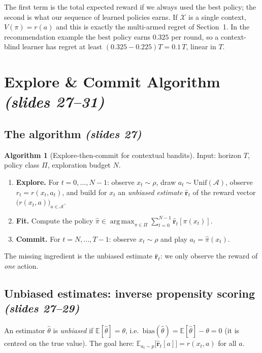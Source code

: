 \documentclass[11pt,a4paper]{article}
\newcommand{\E}{\mathbb{E}}
\newcommand{\Unif}{\mathrm{Unif}}
\newcommand{\rh}{\hat{\mathbf{r}}}
\newcommand{\calA}{\mathcal{A}}
\newcommand{\calX}{\mathcal{X}}
\DeclareMathOperator*{\argmax}{arg\,max}
\newcommand{\slides}[1]{\emph{(slides #1)}}
\theoremstyle{plain}
\theoremstyle{definition}
\newtheorem{algorithm}[theorem]{Algorithm}
\theoremstyle{remark}
\begin{document}
\begin{intuition}
The first term is the total expected reward if we always used the best policy; the second is what our sequence of learned policies earns.
If $\calX$ is a single context, $V(\pi)=r(a)$ and this is exactly the multi-armed regret of Section~1. In the recommendation example the
best policy earns $0.325$ per round, so a context-blind learner has regret at least $(0.325-0.225)T=0.1\,T$, linear in $T$.
\end{intuition}

\section{Explore \& Commit Algorithm \slides{27--31}}

\subsection{The algorithm \slides{27}}

\begin{algorithm}[Explore-then-commit for contextual bandits]\label{alg:ec}
Input: horizon $T$, policy class $\Pi$, exploration budget $N$.
\begin{enumerate}
 \item \textbf{Explore.} For $t=0,\dots,N-1$: observe $x_t\sim\rho$, draw $a_t\sim\Unif(\calA)$, observe $r_t=r(x_t,a_t)$, and build for $x_t$ an
       \emph{unbiased estimate} $\rh_t$ of the reward vector $\bigl(r(x_t,a)\bigr)_{a\in\calA}$.
 \item \textbf{Fit.} Compute the policy $\displaystyle\hat\pi\in\argmax_{\pi\in\Pi}\sum_{t=0}^{N-1}\rh_t[\pi(x_t)]$.
 \item \textbf{Commit.} For $t=N,\dots,T-1$: observe $x_t\sim\rho$ and play $a_t=\hat\pi(x_t)$.
\end{enumerate}
\end{algorithm}

The missing ingredient is the unbiased estimate $\rh_t$: we only observe the reward of \emph{one} action.

\subsection{Unbiased estimates: inverse propensity scoring \slides{27--29}}

An estimator $\hat\theta$ is \emph{unbiased} if $\E[\hat\theta]=\theta$, i.e.\ $\mathrm{bias}(\hat\theta)=\E[\hat\theta]-\theta=0$ (it is centred on the true value).
The goal here: $\E_{a_t\sim p}\bigl[\rh_t[a]\bigr]=r(x_t,a)$ for all $a$.
\end{document}
